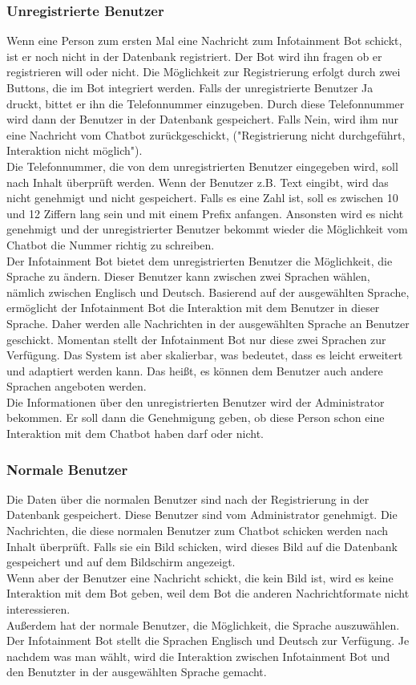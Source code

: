 \subsubsection{Unregistrierte Benutzer}
Wenn eine Person zum ersten Mal eine Nachricht zum Infotainment Bot schickt, ist er noch nicht in der Datenbank registriert. Der Bot wird ihn fragen ob er registrieren will oder nicht. Die Möglichkeit zur Registrierung erfolgt durch zwei Buttons, die im Bot integriert werden. Falls der unregistrierte Benutzer Ja druckt, bittet er ihn die Telefonnummer einzugeben. Durch diese Telefonnummer wird dann der Benutzer in der Datenbank gespeichert. Falls Nein, wird ihm nur eine Nachricht vom Chatbot zurückgeschickt, ("Registrierung nicht durchgeführt, Interaktion nicht möglich").\\
Die Telefonnummer, die von dem unregistrierten Benutzer eingegeben wird, soll nach Inhalt überprüft werden. Wenn der Benutzer z.B. Text eingibt, wird das nicht genehmigt und nicht gespeichert. Falls es eine Zahl ist, soll es zwischen 10 und 12 Ziffern lang sein und mit einem Prefix anfangen. Ansonsten wird es nicht genehmigt und der unregistrierter Benutzer bekommt wieder die Möglichkeit vom Chatbot die Nummer richtig zu schreiben. \\
Der Infotainment Bot bietet dem unregistrierten Benutzer die M\"oglichkeit, die Sprache zu \"andern. Dieser Benutzer kann zwischen zwei Sprachen w\"ahlen, n\"amlich zwischen Englisch und Deutsch.
Basierend auf der ausgewählten Sprache, erm\"oglicht der Infotainment Bot die Interaktion mit dem Benutzer in dieser Sprache. Daher werden alle Nachrichten in der ausgewählten Sprache an Benutzer geschickt. Momentan stellt der Infotainment Bot nur diese zwei Sprachen zur Verf\"ugung. Das System ist aber skalierbar, was bedeutet, dass es leicht erweitert und adaptiert werden kann. Das hei\ss{}t, es k\"onnen dem Benutzer auch andere Sprachen angeboten werden. \\
Die Informationen über den unregistrierten Benutzer wird der Administrator bekommen. Er soll dann die Genehmigung geben, ob diese Person schon eine Interaktion mit dem Chatbot haben darf oder nicht. 
\subsubsection{Normale Benutzer}
Die Daten über die normalen Benutzer sind nach der Registrierung in der Datenbank gespeichert. Diese Benutzer sind vom Administrator genehmigt. Die Nachrichten, die diese normalen Benutzer zum Chatbot schicken werden nach Inhalt überprüft. Falls sie ein Bild schicken, wird dieses Bild auf die Datenbank gespeichert und auf dem Bildschirm angezeigt. \\
Wenn aber der Benutzer eine Nachricht schickt, die kein Bild ist, wird es keine Interaktion mit dem Bot geben, weil dem Bot die anderen Nachrichtformate nicht interessieren. \\
Au\ss{}erdem hat der normale Benutzer, die M\"oglichkeit, die Sprache auszuw\"ahlen. Der Infotainment Bot stellt die Sprachen Englisch und Deutsch zur Verf\"ugung. Je nachdem was man w\"ahlt, wird die Interaktion zwischen Infotainment Bot und den Benutzter in der ausgew\"ahlten Sprache gemacht. 

